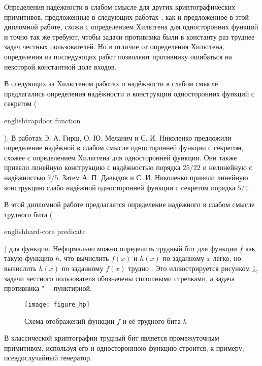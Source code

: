 \documentclass[a4paper, 14pt]{extarticle}
\begin{document}

Определения надёжности в слабом смысле для других криптографических примитивов,
предложенные в следующих работах \cite{HN09,DN11,hirsch_milanich_nikolenko},
как и предложенное в этой дипломной работе, схожи с определением Хильтгена для
односторонних функций и точно так же требуют, чтобы задачи противника были в
константу раз труднее задач честных пользователей. Но в отличие от определения
Хильтгена, определения из последующих работ позволяют противнику ошибаться на
некоторой константной доле входов.

В следующих за Хильтгеном работах о надёжности в слабом смысле предлагались
определения надёжности и конструкции односторонних функций с секретом
(\begin{foreignlanguage}{english}trapdoor function\end{foreignlanguage}). В
работах \cite{HN09,hirsch_milanich_nikolenko} Э. А. Гирш, О. Ю. Меланич и С. И.
Николенко предложили определение надёжной в слабом смысле односторонней функции
с секретом, схожее с определением Хильтгена для односторонней функции. Они
также привели линейную конструкцию с надёжностью порядка $25/22$ и нелинейную
с надёжностью $7/5$. Затем \cite{DN11} А. П. Давыдов и С. И. Николенко привели
линейную конструкцию слабо надёжной односторонней функции с секретом порядка
$5/4$.

В этой дипломной работе предлагается определение надёжного в слабом
смысле трудного бита (\begin{foreignlanguage}{english}hard-core
predicate\end{foreignlanguage}) для функции. Неформально можно определить
трудный бит для функции $f$ как такую функцию $h$, что вычислить $f(x)$ и
$h(x)$ по заданному $x$ легко, но вычислить $h(x)$ по заданному $f(x)$ трудно
\cite{goldreich}. Это иллюстрируется рисунком \ref{fig_hp}, задачи честного
пользователя обозначены сплошными стрелками, а задача противника "---
пунктирной.

\begin{figure}[h]
\centering
\texttt{[image: figure\_hp]}
\caption{Схема отображений функции $f$ и её трудного бита $h$}
\label{fig_hp}
\end{figure}

В классической криптографии трудный бит является промежуточным примитивом,
используя его и одностороннюю функцию строится, к примеру, псевдослучайный
генератор.
\end{document}
